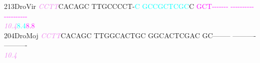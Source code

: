 \documentclass[11pt,twoside,reqno,a4paper]{article}
\begin{document}
{213\hspace*{1\charwidth}DroVir	\textit{\textcolor{violet}{C}}\textit{\textcolor{violet}{C}}\textit{\textcolor{violet}{T}}\textit{\textcolor{violet}{T}}CACAGC	TTGCCCCT-\textcolor{cyan}{C}	\textcolor{cyan}{G}\textcolor{cyan}{C}\textcolor{cyan}{C}\textcolor{cyan}{G}\textcolor{cyan}{C}\textcolor{cyan}{T}\textcolor{cyan}{C}\textcolor{cyan}{G}\textcolor{cyan}{C}C	\textcolor{magenta}{G}\textcolor{magenta}{C}\textcolor{magenta}{T}\textcolor{magenta}{-}\textcolor{magenta}{-}\textcolor{magenta}{-}\textcolor{magenta}{-}\textcolor{magenta}{-}\textcolor{magenta}{-}\textcolor{magenta}{-}	\textcolor{magenta}{-}\textcolor{magenta}{-}\textcolor{magenta}{-}\textcolor{magenta}{-}\textcolor{magenta}{-}\textcolor{magenta}{-}\textcolor{magenta}{-}\textcolor{magenta}{-}\textcolor{magenta}{-}\textcolor{magenta}{-}	\textcolor{magenta}{-}\textcolor{magenta}{-}\textcolor{magenta}{-}\textcolor{magenta}{-}\textcolor{magenta}{-}\textcolor{magenta}{-}\textcolor{magenta}{-}\textcolor{magenta}{-}\textcolor{magenta}{-}\textcolor{magenta}{-}	\\
\hspace*{4\charwidth}\hspace*{7\charwidth}\hspace*{0\charwidth}\textit{\textcolor{violet}{10.4}}\hspace*{1\charwidth}\hspace*{15\charwidth}\textcolor{cyan}{8.4}\hspace*{1\charwidth}\hspace*{1\charwidth}\hspace*{8\charwidth}\textcolor{magenta}{8.8}\hspace*{1\charwidth}\hspace*{1\charwidth}\hspace*{1\charwidth}\\
204\hspace*{1\charwidth}DroMoj	\textit{\textcolor{violet}{C}}\textit{\textcolor{violet}{C}}\textit{\textcolor{violet}{T}}\textit{\textcolor{violet}{T}}CACAGC	TTGGCACTGC	GGCACTCGAC	GC--------	----------	----------	\\
\hspace*{4\charwidth}\hspace*{7\charwidth}\hspace*{0\charwidth}\textit{\textcolor{violet}{10.4}}\hspace*{1\charwidth}\hspace*{1\charwidth}\hspace*{1\charwidth}\hspace*{1\charwidth}\hspace*{1\charwidth}\hspace*{1\charwidth}\\
}
\end{document}
